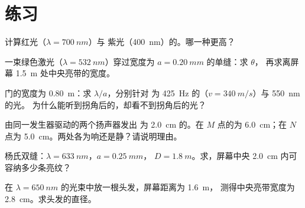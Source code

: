 \section{练习}

\begin{exercise}[$\star$]\label{exo:g12:light-as-wave:1}
计算红光（$\lambda = \qty{700}{nm}$）与
紫光（\qty{400}{nm}）的。哪一种更高？
\end{exercise}

\begin{exercise}[$\star$]\label{exo:g12:light-as-wave:2}
一束绿色激光（$\lambda = \qty{532}{nm}$）穿过宽度为
$a = \qty{0.20}{mm}$ 的单缝：求 $\theta$，
再求离屏幕 \qty{1.5}{m} 处中央亮带的宽度。
\end{exercise}

\begin{exercise}[$\star$]\label{exo:g12:light-as-wave:3}
门的宽度为 \qty{0.80}{m}：求 $\lambda/a$，分别针对
为 \qty{425}{Hz} 的（$v = \qty{340}{m/s}$）与 \qty{550}{nm} 的光。
为什么能听到拐角后的，却看不到拐角后的光？
\end{exercise}

\begin{exercise}[$\star$]\label{exo:g12:light-as-wave:4}
由同一发生器驱动的两个扬声器发出
为 \qty{2.0}{cm} 的。在 $M$ 点的为 \qty{6.0}{cm}；在
$N$ 点为 \qty{5.0}{cm}。两处各为响还是静？请说明理由。
\end{exercise}

\begin{exercise}[$\star$]\label{exo:g12:light-as-wave:5}
杨氏双缝：$\lambda = \qty{633}{nm}$，$a = \qty{0.25}{mm}$，
$D = \qty{1.8}{m}$。求，屏幕中央
\qty{2.0}{cm} 内可容纳多少条亮纹？
\end{exercise}

\begin{exercise}[$\star\star$]\label{exo:g12:light-as-wave:6}
在 $\lambda = \qty{650}{nm}$ 的光束中放一根头发，屏幕距离为 \qty{1.6}{m}，
测得中央亮带宽度为 \qty{2.8}{cm}。求头发的直径。
\end{exercise}


